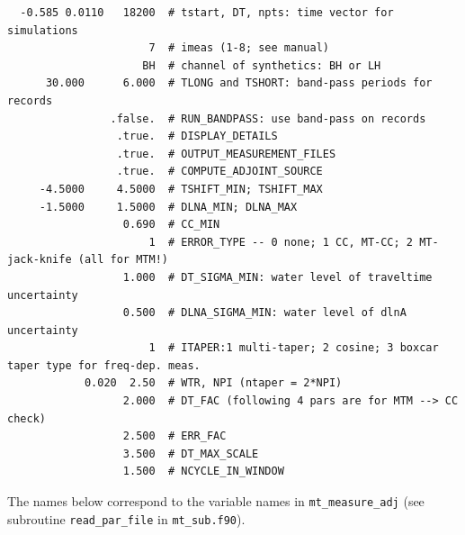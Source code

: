 \documentclass[11pt,titlepage,fleqn]{article}
\begin{document}
\begin{verbatim}
  -0.585 0.0110   18200  # tstart, DT, npts: time vector for simulations
                      7  # imeas (1-8; see manual)
                     BH  # channel of synthetics: BH or LH 
      30.000      6.000  # TLONG and TSHORT: band-pass periods for records
                .false.  # RUN_BANDPASS: use band-pass on records
                 .true.  # DISPLAY_DETAILS
                 .true.  # OUTPUT_MEASUREMENT_FILES
                 .true.  # COMPUTE_ADJOINT_SOURCE
     -4.5000     4.5000  # TSHIFT_MIN; TSHIFT_MAX
     -1.5000     1.5000  # DLNA_MIN; DLNA_MAX
                  0.690  # CC_MIN
                      1  # ERROR_TYPE -- 0 none; 1 CC, MT-CC; 2 MT-jack-knife (all for MTM!)
                  1.000  # DT_SIGMA_MIN: water level of traveltime uncertainty
                  0.500  # DLNA_SIGMA_MIN: water level of dlnA uncertainty
                      1  # ITAPER:1 multi-taper; 2 cosine; 3 boxcar taper type for freq-dep. meas.
            0.020  2.50  # WTR, NPI (ntaper = 2*NPI)
                  2.000  # DT_FAC (following 4 pars are for MTM --> CC check)
                  2.500  # ERR_FAC
                  3.500  # DT_MAX_SCALE
                  1.500  # NCYCLE_IN_WINDOW
\end{verbatim}
%
The names below correspond to the variable names in \verb+mt_measure_adj+ (see subroutine \verb+read_par_file+ in \verb+mt_sub.f90+).
%
\end{document}
